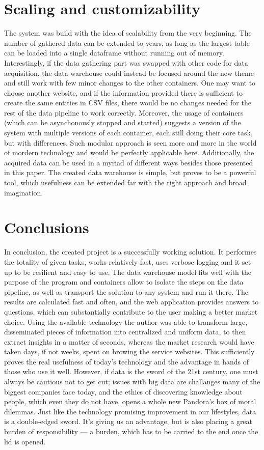 \section{Scaling and customizability}
The system was build with the idea of scalability from the very beginning. The number of gathered data can be extended to years, as long as the largest table can be loaded into a single dataframe without running out of memory. Interestingly, if the data gathering part was swapped with other code for data acquisition, the data warehouse could instead be focused around the new theme and still work with few minor changes to the other containers. One may want to choose another website, and if the information provided there is sufficient to create the same entities in CSV files, there would be no changes needed for the rest of the data pipeline to work correctly. Moreover, the usage of containers (which can be asynchonously stopped and started) suggests a version of the system with multiple versions of each container, each still doing their core task, but with differences. Such modular approach is seen more and more in the world of mordern technology and would be perfectly applicable here. Additionally, the acquired data can be used in a myriad of different ways besides those presented in this paper. The created data warehouse is simple, but proves to be a powerful tool, which usefulness can be extended far with the right approach and broad imagination.

\section{Conclusions}
In conclusion, the created project is a successfully working solution. It performes the totality of given tasks, works relatively fast, uses verbose logging and it set up to be resilient and easy to use. The data warehouse model fits well with the purpose of the program and containers allow to isolate the steps on the data pipeline, as well as transport the solution to any system and run it there. The results are calculated fast and often, and the web application provides answers to questions, which can substantially contribute to the user making a better market choice. Using the available technology the author was able to transform large, disseminated pieces of information into centralized and uniform data, to then extract insights in a matter of seconds, whereas the market research would have taken days, if not weeks, spent on browing the service websites. This sufficiently proves the real usefulness of today's technology and the advantage in hands of those who use it well. However, if data is the sword of the 21st century, one must always be cautious not to get cut; issues with big data are challanges many of the biggest companies face today, and the ethics of discovering knowledge about people, which even they do not have, opens a whole new Pandora's box of moral dilemmas. Just like the technology promising improvement in our lifestyles, data is a double-edged sword. It's giving us an advantage, but is also placing a great burden of responsibility --- a burden, which has to be carried to the end once the lid is opened.
